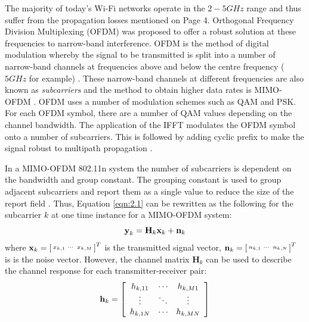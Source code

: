 \vspace{22pt}
The majority of today's Wi-Fi networks operate in the $2-5GHz$ range and thus suffer from the propagation losses mentioned on Page 4. Orthogonal Frequency Division Multiplexing (OFDM) was proposed to offer a robust solution at these frequencies to narrow-band interference. OFDM is the method of digital modulation whereby the signal to be transmitted is split into a number of narrow-band channels at frequencies above and below the centre frequency ($5GHz$ for example) \citep{OFDM}. 
These narrow-band channels at different frequencies are also known as \textit{subcarriers} and the method to obtain higher data rates is MIMO-OFDM \citep{802.11nStandard}. OFDM uses a number of modulation schemes such as QAM and PSK. For each OFDM symbol, there are a number of QAM values depending on the channel bandwidth. The application of the IFFT modulates the OFDM symbol onto a number of subcarriers. This is followed by adding cyclic prefix to make the signal robust to multipath propagation \citep{OFDM, 802.11nStandard}. \par

In a MIMO-OFDM 802.11n system the number of subcarriers is dependent on the bandwidth and group constant. The grouping constant is used to group adjacent subcarriers and report them as a single value to reduce the size of the report field \citep{full802.11nStandard}. Thus, Equation \ref{eqn:2.1} can be rewritten as the following for the subcarrier $k$ at one time instance for a MIMO-OFDM system:
\vspace{-11pt}
\begin{equation}\label{eqn:2.2}
    \textbf{y}_k = \textbf{H}_k\textbf{x}_k+\textbf{n}_k
    \vspace{-11pt}
\end{equation}
where $\textbf{x}_k = \begin{bsmallmatrix}x_{k,1} & \cdots & x_{k,M}\end{bsmallmatrix}^T$ is the transmitted signal vector, $\textbf{n}_k = \begin{bsmallmatrix}n_{k,1} & \cdots & n_{k,N}\end{bsmallmatrix}^T$ is is the noise vector. However, the channel matrix $\textbf{H}_{k}$ can be used to describe the channel response for each transmitter-receiver pair: 
\vspace{-11pt}
\begin{equation}\label{eqn:2.3}
\textbf{h}_{k}=\left[
\begin{array}{ccc}
    h_{k,11} & \cdots & h_{k,M1} \\
   \vdots & \ddots & \vdots \\
    h_{k,1N} & \cdots & h_{k,MN}
\end{array}
\right]
\vspace{-11pt}
\end{equation}
